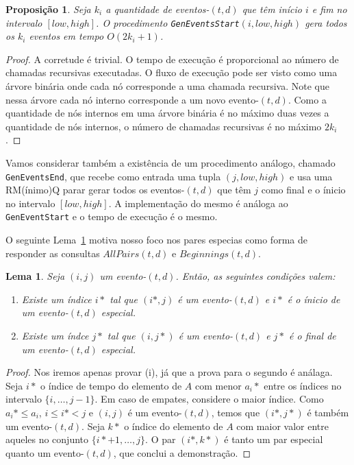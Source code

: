 \documentclass[12pt]{article}
\newtheorem{lem}[thm]{Lema}
\newtheorem{prop}[thm]{Proposição}
\begin{document}
\begin{prop}
Seja $k_i$ a quantidade de eventos-$(t,d)$ que têm início $i$ e fim no intervalo $[low, high]$.
O procedimento {\tt GenEventsStart}$(i, low, high)$ gera todos os $k_i$ eventos em tempo $O(2k_i + 1)$.
\end{prop}
\begin{proof}
A corretude é trivial. O tempo de execução é proporcional ao número de chamadas recursivas
executadas. O fluxo de execução pode ser visto como uma árvore binária onde cada nó corresponde
a uma chamada recursiva. Note que nessa árvore cada nó interno corresponde a um novo evento-$(t,d)$.
Como a quantidade de nós internos em uma árvore binária é no máximo duas vezes a quantidade de nós
internos, o número de chamadas recursivas é no máximo $2k_i$.
\end{proof}

Vamos considerar também a existência de um procedimento análogo, chamado {\tt GenEventsEnd}, que recebe
como entrada uma tupla $(j, low, high)$ e usa uma RM(ínimo)Q parar gerar todos os eventos-$(t,d)$ que 
têm $j$ como final e o ínicio no intervalo $[low, high]$. A implementação do mesmo é análoga ao 
{\tt GenEventStart} e o tempo de execução é o mesmo.  

O seguinte Lema~\ref{mainlem} motiva nosso foco nos pares especias como forma de responder as consultas
$AllPairs(t,d)$ e $Beginnings(t,d)$.

\begin{lem}  
Seja $(i, j)$ um evento-$(t,d)$. Então, as seguintes condições valem:
\begin{enumerate}
\item Existe um índice $i*$ tal que $(i*, j)$ é um evento-$(t,d)$ e $i*$ é o ínicio de um 
evento-$(t,d)$ especial. 
\item Existe um índce $j*$ tal que $(i, j*)$ é um evento-$(t,d)$ e $j*$ é o final de um
evento-$(t,d)$ especial.
\end{enumerate}
\label{mainlem}
\end{lem}
\begin{proof}
Nos iremos apenas provar (i), já que a prova para o segundo é análaga. Seja $i*$ o índice
de tempo do elemento de $A$ com menor $a_i*$ entre os índices no intervalo $\{i, \ldots, j -1\}$.
Em caso de empates, considere o maior índice. Como $a_i* \le a_i$, $i \le i* < j$ e $(i, j)$ é um
evento-$(t,d)$, temos que $(i*, j*)$ é também um evento-$(t,d)$. Seja $k*$ o índice do elemento
de $A$ com maior valor entre aqueles no conjunto $\{i* + 1, \ldots, j\}$. O par $(i*, k*)$ é 
tanto um par especial quanto um evento-$(t,d)$, que conclui a demonstração.
\end{proof}
\end{document}
